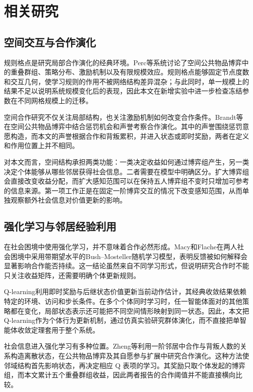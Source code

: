 \section{相关研究}
\subsection{空间交互与合作演化}

规则格点是研究局部合作演化的经典环境。Perc等系统讨论了空间公共物品博弈中的重叠群组、策略分布、激励机制以及有限规模效应\cite{perc2017statistical}。规则格点能够固定节点度数和交互几何，使学习规则的作用不被网络结构差异混杂；与此同时，单一规模上的结果不足以说明系统规模变化后的表现，因此本文在新增实验中进一步检查冻结参数在不同网格规模上的迁移。

空间合作研究不仅关注局部结构，也关注激励机制如何改变合作条件。Brandt等在空间公共物品博弈中结合惩罚机会和声誉考察合作演化\cite{brandt2003punishment}。其中的声誉围绕惩罚意愿构造，而本文的声誉根据合作和背叛累积，并进入状态或即时奖励，两者在定义和作用位置上并不相同。

对本文而言，空间结构承担两类功能：一类决定收益如何通过博弈组产生，另一类决定个体能够从哪些邻居获得社会信息。二者需要在模型中明确区分。扩大博弈组会直接改变收益分配，而扩大感知范围可以在保持五人博弈组不变时只增加可参考的信息来源。第一项工作正是在固定一阶博弈交互的情况下改变感知范围，从而单独观察额外社会信息对价值更新的影响。

\subsection{强化学习与邻居经验利用}

在社会困境中使用强化学习，并不意味着合作必然形成。Macy和Flache在两人社会困境中采用带期望水平的Bush--Mosteller随机学习模型，表明反馈被如何解释会显著影响合作能否持续\cite{macy2002learning}。这一结论虽然来自不同学习形式，但说明研究合作时不能只关注收益矩阵，还需要明确个体更新规则。

Q-learning利用即时奖励与后继状态价值更新当前动作估计，其经典收敛结果依赖特定的环境、访问和步长条件\cite{watkins1992q}。在多个个体同时学习时，任一智能体面对的其他策略都在变化，局部状态表示还可能把不同空间情形映射到同一状态。因此，本文把 Q-learning作为个体行为更新机制，通过仿真实验研究群体演化，而不直接把单智能体收敛定理套用于整个系统。

社会信息进入强化学习有多种位置。Zheng等利用一阶邻居中合作与背叛人数的关系构造离散状态，在公共物品博弈及其自愿参与扩展中研究合作演化\cite{zheng2024evolution}。这种方法使邻域结构首先影响状态，再决定相应 Q 表项的学习。其奖励只取个体发起的博弈组，而本文累计五个重叠群组收益，因此两者报告的合作阈值并不能直接横向比较。

